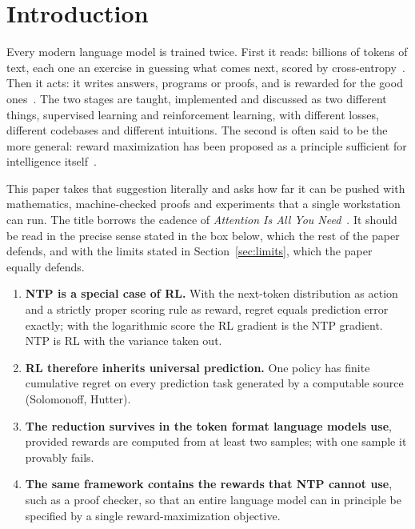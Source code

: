 \documentclass[11pt]{article}
\theoremstyle{definition}
\begin{document}
\tableofcontents
\bigskip

\section{Introduction}\label{sec:intro}

Every modern language model is trained twice. First it reads: billions of tokens of text, each one an exercise in guessing what comes next, scored by cross-entropy~\cite{radford2018gpt,radford2019gpt2}. Then it acts: it writes answers, programs or proofs, and is rewarded for the good ones~\cite{ouyang2022,shao2024deepseekmath,deepseek2025r1}. The two stages are taught, implemented and discussed as two different things, supervised learning and reinforcement learning, with different losses, different codebases and different intuitions. The second is often said to be the more general: reward maximization has been proposed as a principle sufficient for intelligence itself~\cite{silver2021reward}.

This paper takes that suggestion literally and asks how far it can be pushed with mathematics, machine-checked proofs and experiments that a single workstation can run. The title borrows the cadence of \emph{Attention Is All You Need}~\cite{vaswani2017attention}. It should be read in the precise sense stated in the box below, which the rest of the paper defends, and with the limits stated in Section~\ref{sec:limits}, which the paper equally defends.

\begin{thesis}[Thesis]
\begin{enumerate}[leftmargin=*,label=\textbf{T\arabic*.},itemsep=2pt]
\item \textbf{NTP is a special case of RL.} With the next-token distribution as action and a strictly proper scoring rule as reward, regret equals prediction error exactly; with the logarithmic score the RL gradient is the NTP gradient. NTP is RL with the variance taken out.
\item \textbf{RL therefore inherits universal prediction.} One policy has finite cumulative regret on every prediction task generated by a computable source (Solomonoff, Hutter).
\item \textbf{The reduction survives in the token format language models use}, provided rewards are computed from at least two samples; with one sample it provably fails.
\item \textbf{The same framework contains the rewards that NTP cannot use}, such as a proof checker, so that an entire language model can in principle be specified by a single reward-maximization objective.
\end{enumerate}
\end{thesis}
\end{document}

